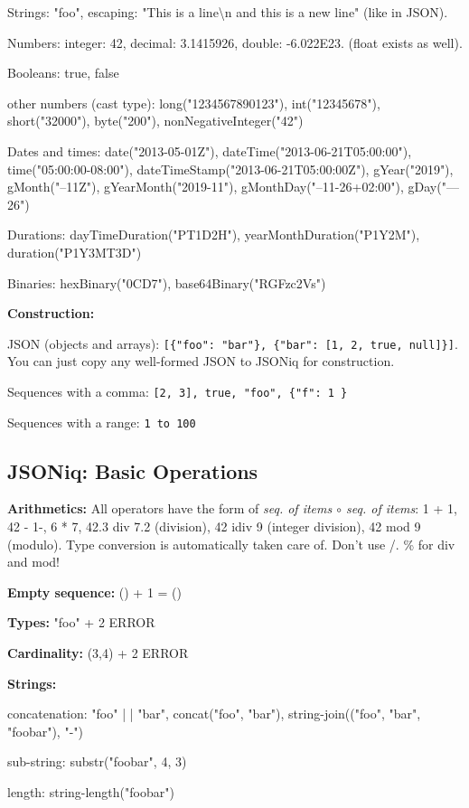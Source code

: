 \documentclass[11pt,oneside,a4paper]{article}
\begin{document}
{\begin{compactitem}
\item Strings: "foo", escaping: "This is a line\textbackslash n and this is a new line" (like in JSON).
\item Numbers: integer: 42, decimal: 3.1415926, double: -6.022E23. (float exists as well).
\item Booleans: true, false
\item other numbers (cast type): long("1234567890123"), int("12345678"), short("32000"), byte("200"), nonNegativeInteger("42")
\item Dates and times: date("2013-05-01Z"), dateTime("2013-06-21T05:00:00"), time("05:00:00-08:00"), dateTimeStamp("2013-06-21T05:00:00Z"), gYear("2019"), gMonth("--11Z"), gYearMonth("2019-11"), gMonthDay("--11-26+02:00"), gDay("---26")
\item Durations: dayTimeDuration("PT1D2H"), yearMonthDuration("P1Y2M"), duration("P1Y3MT3D")
\item Binaries: hexBinary("0CD7"), base64Binary("RGFzc2Vs")\\
\end{compactitem}

\textbf{Construction:}
\begin{compactitem}
\item JSON (objects and arrays): \texttt{[\{"foo": "bar"\}, \{"bar": [1, 2, true, null]\}]}. You can just copy any well-formed JSON to JSONiq for construction.
\item Sequences with a comma: \texttt{[2, 3], true, "foo", \{"f": 1 \}}
\item Sequences with a range: \texttt{1 to 100}
\end{compactitem}

\subsection{JSONiq: Basic Operations}

\textbf{Arithmetics:} All operators have the form of \textit{seq. of items $\circ$ seq. of items}: 1 + 1, 42 - 1-, 6 * 7, 42.3 div 7.2 (division), 42 idiv 9 (integer division), 42 mod 9 (modulo). Type conversion is automatically taken care of. Don't use /. \% for div and mod!

\textbf{Empty sequence:} () + 1 = ()

\textbf{Types:} "foo" + 2 ERROR

\textbf{Cardinality:} (3,4) + 2 ERROR

\textbf{Strings:}
\begin{compactitem}
\item concatenation: "foo" | | "bar", concat("foo", "bar"), string-join(("foo", "bar", "foobar"), "-")
\item sub-string: substr("foobar", 4, 3)
\item length: string-length("foobar")
\end{compactitem}

}
\end{document}
